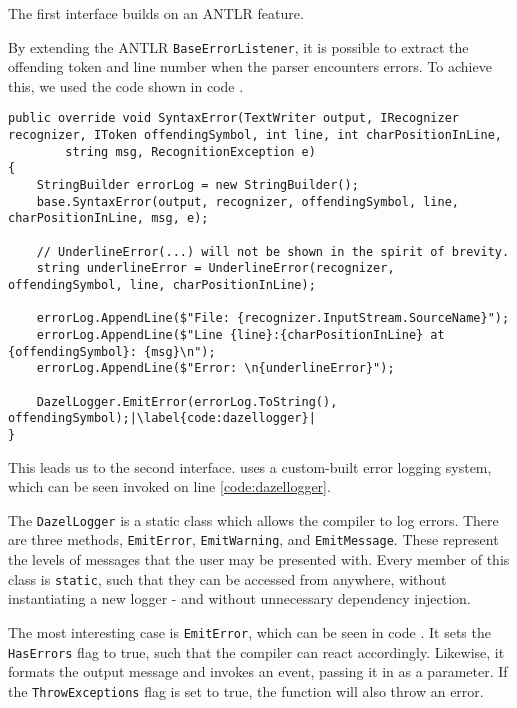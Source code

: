 The first interface builds on an ANTLR feature. 

By extending the ANTLR \texttt{BaseErrorListener}, it is possible to extract the offending token and line number when the parser encounters errors. To achieve this, we used the code shown in code .

\begin{lstlisting}[caption={The altered \texttt{SyntaxError} method.}, label={lst:SyntaxErrorCode}, escapechar=|]
public override void SyntaxError(TextWriter output, IRecognizer recognizer, IToken offendingSymbol, int line, int charPositionInLine,
        string msg, RecognitionException e)
{
    StringBuilder errorLog = new StringBuilder();
    base.SyntaxError(output, recognizer, offendingSymbol, line, charPositionInLine, msg, e);
    
    // UnderlineError(...) will not be shown in the spirit of brevity.
    string underlineError = UnderlineError(recognizer, offendingSymbol, line, charPositionInLine);

    errorLog.AppendLine($"File: {recognizer.InputStream.SourceName}");
    errorLog.AppendLine($"Line {line}:{charPositionInLine} at {offendingSymbol}: {msg}\n");
    errorLog.AppendLine($"Error: \n{underlineError}");

    DazelLogger.EmitError(errorLog.ToString(), offendingSymbol);|\label{code:dazellogger}|
}
\end{lstlisting}

This leads us to the second interface. \dazel{} uses a custom-built error logging system, which can be seen invoked on line \ref{code:dazellogger}.

The \texttt{DazelLogger} is a static class which allows the \dazel{} compiler to log errors. There are three methods, \texttt{EmitError}, \texttt{EmitWarning}, and \texttt{EmitMessage}. These represent the levels of messages that the user may be presented with. Every member of this class is \texttt{static}, such that they can be accessed from anywhere, without instantiating a new logger - and without unnecessary dependency injection.

The most interesting case is \texttt{EmitError}, which can be seen in code . It sets the \texttt{HasErrors} flag to true, such that the \dazel{} compiler can react accordingly. Likewise, it formats the output message and invokes an event, passing it in as a parameter.
If the \texttt{ThrowExceptions} flag is set to true, the function will also throw an error.

